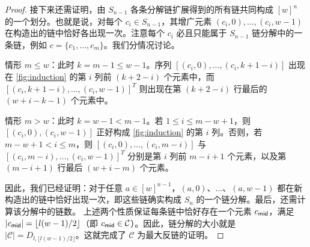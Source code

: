 \begin{proof}
接下来还需证明，由 $S_{n-1}$ 各条分解链扩展得到的所有链共同构成 $[w]^n$ 的一个划分。也就是说，对每个 $c_i \in S_{n-1}$，其增广元素 $(c_i,0),...,(c_i,w-1)$ 在构造出的链中恰好各出现一次。注意每个 $c_i$ 必且只能属于 $S_{n-1}$ 链分解中的一条链，例如
$c=\{c_1,\ldots, c_m\}$。我们分情况讨论。

情形 $m\leq w$：此时 $k=m-1\leq w-1$。序列
$[(c_i,0),\ldots, (c_i,k+1-i)]$
出现在 \cref{fig:induction} 的第 $i$ 列前 $(k+2-i)$ 个元素中，而
$[(c_i,k+1-i),\ldots, (c_i,w-1)]^T$
则出现在第 $(k+2-i)$ 行最后的 $(w+i-k-1)$ 个元素中。

情形 $m> w$：此时 $k=w-1 < m-1$。若 $1\leq i\leq m-w+1$，则
$[(c_i,0),(c_i,w-1)]$
正好构成 \cref{fig:induction} 的第 $i$ 列。否则，若
$m-w+1<i\leq m$，则
$[(c_i,0),\ldots, (c_i,m-i)]$ 与
$[(c_i,m-i),\ldots, (c_i,w-1)]^T$
分别是第 $i$ 列前 $m-i+1$ 个元素，以及第 $(m-i+1)$ 行最后 $(w+i-m)$ 个元素。

因此，我们已经证明：对于任意 $a \in [w]^{n-1}$，$(a, 0)$、$\ldots$、$(a,w-1)$ 都在新构造出的链中恰好出现一次，即这些链确实构成 $S_n$ 的一个链分解。最后，还需计算该分解中的链数。
上述两个性质保证每条链中恰好存在一个元素 $c_{\sf mid}$，满足
$|c_{\sf mid}|=\lfloor l(w-1)/2 \rfloor$（即 $c_{\sf mid} \in \mathcal{C}$）。因此，链分解的大小就是
$|\mathcal{C}| = D_{l, \lfloor{l(w-1)/2}\rfloor}$。这就完成了 $\mathcal{C}$ 为最大反链的证明。

\end{proof}

